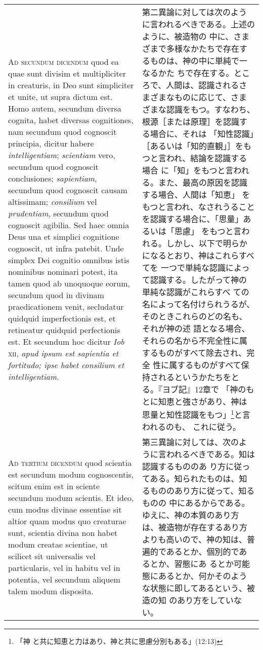 \documentclass[10pt]{jsarticle} %
\begin{document}
\begin{longtable}{p{21em}p{21em}}
\\



{\scshape Ad secundum dicendum} quod ea quae sunt divisim et
multipliciter in creaturis, in Deo sunt simpliciter et unite, ut supra
dictum est. Homo autem, secundum diversa cognita, habet diversas
cognitiones, nam secundum quod cognoscit principia, dicitur habere
{\itshape intelligentiam}; {\itshape scientiam} vero, secundum quod
cognoscit conclusiones; {\itshape sapientiam}, secundum quod cognoscit
causam altissimam; {\itshape consilium} vel {\itshape prudentiam},
secundum quod cognoscit agibilia. Sed haec omnia Deus una et simplici
cognitione cognoscit, ut infra patebit. Unde simplex Dei cognitio
omnibus istis nominibus nominari potest, ita tamen quod ab unoquoque
eorum, secundum quod in divinam praedicationem venit, secludatur
quidquid imperfectionis est, et retineatur quidquid perfectionis
est. Et secundum hoc dicitur {\itshape Iob} {\scshape xii}, {\itshape
apud ipsum est sapientia et fortitudo; ipse habet consilium et
intelligentiam}.

&

第二異論に対しては次のように言われるべきである。上述のように、被造物の
中に、さまざまで多様なかたちで存在するものは、神の中に単純で一なるかた
ちで存在する。ところで、人間は、認識されるさまざまなものに応じて、さま
ざまな認識をもつ。すなわち、根源［または原理］を認識する場合に、それは
「知性認識」［あるいは「知的直観」］をもつと言われ、結論を認識する場合
に「知」をもつと言われる。また、最高の原因を認識する場合、人間は「知恵」
をもつと言われ、なされうることを認識する場合に、「思量」あるいは「思慮」
をもつと言われる。しかし、以下で明らかになるとおり、神はこれらすべてを
一つで単純な認識によって認識する。したがって神の単純な認識がこれらすべ
ての名によって名付けられうるが、そのときこれらのどの名も、それが神の述
語となる場合、それらの名から不完全性に属するものがすべて除去され、完全
性に属するものがすべて保持されるというかたちをとる。『ヨブ記』12章で
「神のもとに知恵と強さがあり、神は思量と知性認識をもつ」\footnote{「神
と共に知恵と力はあり、神と共に思慮分別もある」(12:13)}と言われるのも、
これに従う。

\\



{\scshape Ad tertium dicendum} quod scientia est secundum modum
cognoscentis, scitum enim est in sciente secundum modum scientis. Et
ideo, cum modus divinae essentiae sit altior quam modus quo creaturae
sunt, scientia divina non habet modum creatae scientiae, ut scilicet
sit universalis vel particularis, vel in habitu vel in potentia, vel
secundum aliquem talem modum disposita.

&

第三異論に対しては、次のように言われるべきである。知は認識するもののあ
り方に従ってある。知られたものは、知るもののあり方に従って、知るものの
中にあるからである。ゆえに、神の本質のあり方は、被造物が存在するあり方
よりも高いので、神の知は、普遍的であるとか、個別的であるとか、習態にあ
るとか可能態にあるとか、何かそのような状態に即してあるという、被造の知
のあり方をしていない。



\end{longtable}
\end{document}
